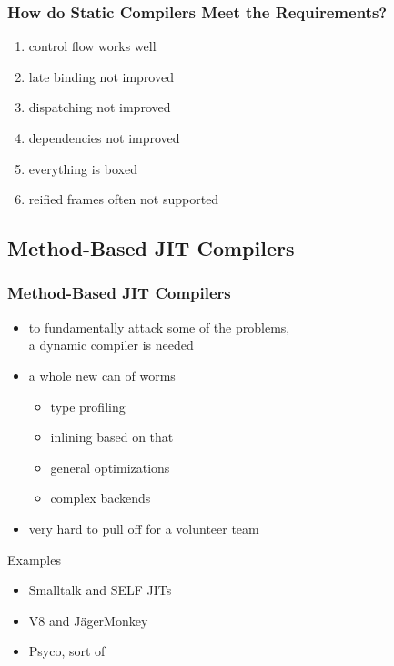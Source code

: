 \documentclass[utf8x]{beamer}
\begin{document}
\begin{frame}
  \frametitle{How do Static Compilers Meet the Requirements?}
  \begin{enumerate}
      \item control flow works well
      \item \alert{late binding not improved}
      \item \alert{dispatching not improved}
      \item \alert{dependencies not improved}
      \item \alert{everything is boxed}
      \item \alert{reified frames often not supported}
  \end{enumerate}
\end{frame}


\subsection{Method-Based JIT Compilers}

\begin{frame}
  \frametitle{Method-Based JIT Compilers}
  \begin{itemize}
      \item to fundamentally attack some of the problems, \\
      a dynamic compiler is needed
      \item a whole new can of worms
      \pause
      \begin{itemize}
          \item type profiling
          \item inlining based on that
          \item general optimizations
          \item complex backends
      \end{itemize}
      \item very hard to pull off for a volunteer team
  \end{itemize}
  \pause
  \begin{block}{Examples}
      \begin{itemize}
          \item Smalltalk and SELF JITs
          \item V8 and JägerMonkey
          \item Psyco, sort of
      \end{itemize}
  \end{block}
\end{frame}
\end{document}
